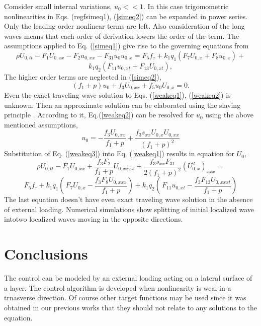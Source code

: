 Comsider  small internal variations, $u_0<<1$. In this case trigomometric nonlinearities in Eqs. (regf{simeq1}), (\ref{simeq2}) can be expanded in power series. Only  the leading order nonlinear terms are left. Also  consideration of the  long waves means that each order of derivation lowers the order of the term.   The assumptions applied to  Eq. (\ref{simeq1}) give rise to the governing equations  from
\[
\rho U_{0,tt}- F_1 U_{0,xx}- F_2 u_{0,xx}-F_{31} u_0 u_{0,x}=F_5 f_\tau+k_1 q_1 (F_7 U_{0,x}+F_8 u_{0,x})+
\]
\begin{equation}
	k_1 q_2 (F_{11} u_{0,xt}+ F_{13} U_{0,xt}) , \label{weakeq1}
\end{equation}
The higher order terms are neglected in (\ref{simeq2}),
\begin{equation}
	(f_1+p)u_0+f_3 U_{0,xx}+f_5 u_0 U_{0,x}=0. \label{weakeq2}
\end{equation}
Even the exact traveling wave solution to Eqs. (\ref{weakeq1}), (\ref{weakeq2}) is unknown. Then an approximate solution can be elaborated using the slaving principle \cite{porpas}. According to it, Eq.(\ref{weakeq2}) can be resolved for $u_0$ using the above mentioned assumptions,
\begin{equation}
	u_0=-\frac{f_3 U_{0,xx}}{f_1+p}+\frac{f_3 s_{xx} U_{0,x} U_{0,xx}}{(f_1+p)^2}\label{weakeq3}
\end{equation}
Substitution of Eq. (\ref{weakeq3}) into Eq. (\ref{weakeq1}) results in equation for $U_0$,
\[
\rho U_{0,tt}- F_1 U_{0,xx}+ \frac{f_3 F_2}{f_1+p}U_{0,xxxx}+\frac{f_3 s_{xx} F_{31}}{2(f_1+p)^2} (U_{0,x}^2)_{xxx}=
\]
\begin{equation}
	F_5 f_\tau+k_1 q_1\left (\frac{}{}F_7 U_{0,x} -\frac{f_3 F_8 U_{0,xxx}}{f_1+p}\right)+ k_1 q_2 \left(\frac{}{}F_{11} u_{0,xt}-\frac{f_3 F_{13} U_{0,xxxt}}{f_1+p}\right) \label{weakeq4}
\end{equation}
The last equation doesn't have even exact traveling wave solution in the absence of external loading. Numerical simulations show splitting of initial localized wave intotwo localized waves moving in the opposite directions. 

\section{Conclusions}
The control can  be modeled by an external loading acting on a lateral surface of a layer. The control algorithm is developed when nonlinearity is weal in a trnasverse direction. Of course other target functions may be used since it was  obtained in our previous works 
\cite{porant16,  porandr17, porant17} that they should not relate to any solutions to the equation.